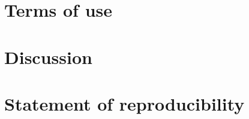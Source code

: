 \section{Terms of use}
\label{sec:5}


\section{Discussion}
\label{sec:6}


\section{Statement of reproducibility\protect\cite{peng2011}}
\label{sec:7}


%


